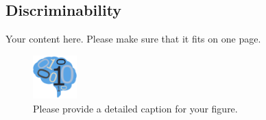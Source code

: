 \documentclass[simplex.tex]{subfiles}
\begin{document}
\subsection{Discriminability}
Your content here. Please make sure that it fits on one page.

\begin{figure}[!h]
\begin{cframed}
\centering
\includegraphics[width=0.15\textwidth]{neurodata_small.png}
\caption{Please provide a detailed caption for your figure.}
\label{fig:name}
\end{cframed}
\end{figure}
%
%
%
\end{document}
